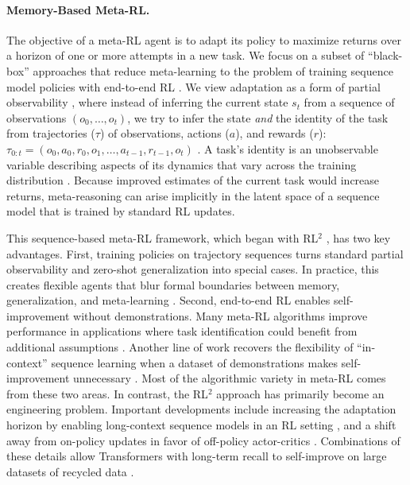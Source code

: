 \label{sec:background}

\paragraph{Memory-Based Meta-RL.} The objective of a meta-RL agent is to adapt its policy to maximize returns over a horizon of one or more attempts in a new task. We focus on a subset of ``black-box'' approaches that reduce meta-learning to the problem of training sequence model policies with end-to-end RL \cite{beck2023survey}. We view adaptation as a form of partial observability \cite{ghosh2021generalization}, where instead of inferring the current state $s_t$ from a sequence of observations $(o_0, \dots, o_t)$, we try to infer the state \textit{and} the identity of the task from trajectories ($\tau$) of observations, actions ($a$), and rewards ($r$): $\tau_{0:t} = (o_0, a_0, r_0, o_1, \dots, a_{t-1}, r_{t-1}, o_t)$ \cite{zintgraf2022fast}. A task's identity is an unobservable variable describing aspects of its dynamics that vary across the training distribution \cite{hallak2015contextual}. Because improved estimates of the current task would increase returns, meta-reasoning can arise implicitly in the latent space of a sequence model that is trained by standard RL updates. 

This sequence-based meta-RL framework, which began with RL$^2$ \cite{wang2016learning, duan2016rl, botvinick2019reinforcement}, has two key advantages. First, training policies on trajectory sequences turns standard partial observability and zero-shot generalization \cite{kirk2022survey} into special cases. In practice, this creates flexible agents that blur formal boundaries between memory, generalization, and meta-learning \cite{benjamins2022contextualize}. Second, end-to-end RL enables self-improvement without demonstrations. Many meta-RL algorithms improve performance in applications where task identification could benefit from additional assumptions \cite{humplik2019meta, liu2021decoupling, rakelly2019efficient, beck2024splagger}. Another line of work recovers the flexibility of ``in-context'' sequence learning when a dataset of demonstrations makes self-improvement unnecessary \cite{laskin2022context, lee2024supervised, raparthy2023generalization, shi2024cross}. Most of the algorithmic variety in meta-RL comes from these two areas. In contrast, the RL$^2$ approach has primarily become an engineering problem. Important developments include increasing the adaptation horizon by enabling long-context sequence models in an RL setting \cite{mishra2017simple, melo2022transformers, lu2023structured}, and a shift away from on-policy updates in favor of off-policy actor-critics \cite{fakoor2019meta, yang2021recurrent, ni2022recurrent}. Combinations of these details allow Transformers with long-term recall to self-improve on large datasets of recycled data \cite{team2023human, ni2023transformers, grigsby2024amago}.

